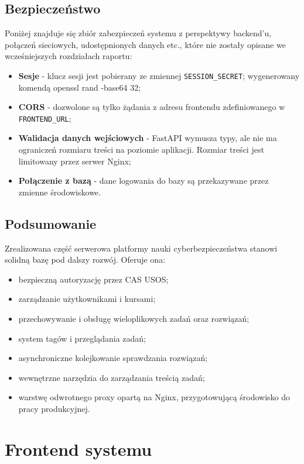\documentclass[12pt,a4paper]{article}
\begin{document}
\subsection{Bezpieczeństwo}
Poniżej znajduje się zbiór zabezpieczeń systemu z perspektywy backend'u, połączeń sieciowych, udostępnionych danych etc., które nie zostały opisane we wcześniejszych rozdziałach raportu: 
\begin{itemize}
    \item \textbf{Sesje} - klucz sesji jest pobierany ze zmiennej \texttt{SESSION\_SECRET}; wygenerowany komendą openssl rand -base64 32; 
    \item \textbf{CORS} - dozwolone są tylko żądania z adresu frontendu zdefiniowanego w \texttt{FRONTEND\_URL};
    \item \textbf{Walidacja danych wejściowych} - FastAPI wymusza typy, ale nie ma ograniczeń rozmiaru treści na poziomie aplikacji. Rozmiar treści jest limitowany przez serwer Nginx;
    \item \textbf{Połączenie z bazą} - dane logowania do bazy są przekazywane przez zmienne środowiskowe.
\end{itemize}

\subsection{Podsumowanie}
Zrealizowana część serwerowa platformy nauki cyberbezpieczeństwa stanowi solidną bazę pod dalszy rozwój. Oferuje ona:
\begin{itemize}
    \item bezpieczną autoryzację przez CAS USOS;
    \item zarządzanie użytkownikami i kursami;
    \item przechowywanie i obsługę wieloplikowych zadań oraz rozwiązań;
    \item system tagów i przeglądania zadań;
    \item asynchroniczne kolejkowanie sprawdzania rozwiązań;
    \item wewnętrzne narzędzia do zarządzania treścią zadań;
    \item warstwę odwrotnego proxy opartą na Nginx, przygotowującą środowisko do pracy produkcyjnej.
\end{itemize}

\newpage


\section{Frontend systemu}
\end{document}
